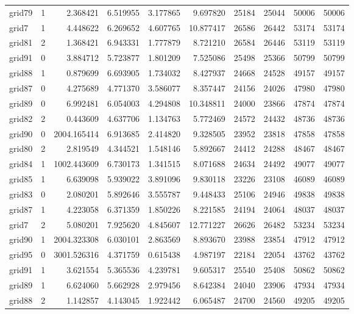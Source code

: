 \begin{longtable}{|l|r|r|r|r|r|r|r|r|r|}
grid79 & 1 & 2.368421 & 6.519955 & 3.177865 & 9.697820 & 25184 & 25044 & 50006 & 50006 \\
grid7 & 1 & 4.448622 & 6.269652 & 4.607765 & 10.877417 & 26586 & 26442 & 53174 & 53174 \\
grid81 & 2 & 1.368421 & 6.943331 & 1.777879 & 8.721210 & 26584 & 26446 & 53119 & 53119 \\
grid91 & 0 & 3.884712 & 5.723877 & 1.801209 & 7.525086 & 25498 & 25366 & 50799 & 50799 \\
grid88 & 1 & 0.879699 & 6.693905 & 1.734032 & 8.427937 & 24668 & 24528 & 49157 & 49157 \\
grid87 & 0 & 4.275689 & 4.771370 & 3.586077 & 8.357447 & 24156 & 24026 & 47980 & 47980 \\
grid89 & 0 & 6.992481 & 6.054003 & 4.294808 & 10.348811 & 24000 & 23866 & 47874 & 47874 \\
grid82 & 2 & 0.443609 & 4.637706 & 1.134763 & 5.772469 & 24572 & 24432 & 48736 & 48736 \\
grid90 & 0 & 2004.165414 & 6.913685 & 2.414820 & 9.328505 & 23952 & 23818 & 47858 & 47858 \\
grid80 & 2 & 2.819549 & 4.344521 & 1.548146 & 5.892667 & 24412 & 24288 & 48467 & 48467 \\
grid84 & 1 & 1002.443609 & 6.730173 & 1.341515 & 8.071688 & 24634 & 24492 & 49077 & 49077 \\
grid85 & 1 & 6.639098 & 5.939022 & 3.891096 & 9.830118 & 23226 & 23108 & 46089 & 46089 \\
grid83 & 0 & 2.080201 & 5.892646 & 3.555787 & 9.448433 & 25106 & 24946 & 49838 & 49838 \\
grid87 & 1 & 4.223058 & 6.371359 & 1.850226 & 8.221585 & 24194 & 24064 & 48037 & 48037 \\
grid7 & 2 & 5.080201 & 7.925620 & 4.845607 & 12.771227 & 26626 & 26482 & 53234 & 53234 \\
grid90 & 1 & 2004.323308 & 6.030101 & 2.863569 & 8.893670 & 23988 & 23854 & 47912 & 47912 \\
grid95 & 0 & 3001.526316 & 4.371759 & 0.615438 & 4.987197 & 22184 & 22054 & 43762 & 43762 \\
grid91 & 1 & 3.621554 & 5.365536 & 4.239781 & 9.605317 & 25540 & 25408 & 50862 & 50862 \\
grid89 & 1 & 6.624060 & 5.662928 & 2.979456 & 8.642384 & 24040 & 23906 & 47934 & 47934 \\
grid88 & 2 & 1.142857 & 4.143045 & 1.922442 & 6.065487 & 24700 & 24560 & 49205 & 49205 \\

\end{longtable}
